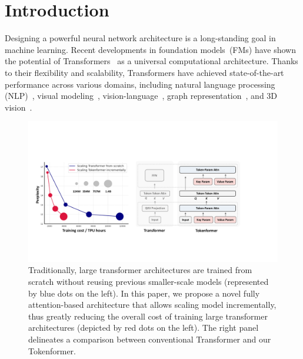 \documentclass{article} %
\begin{document}
\section{Introduction} \label{sec:intro}
Designing a powerful neural network architecture is a long-standing goal in machine learning. Recent developments in foundation models~(FMs) have shown the potential of Transformers~\citep{vaswani2017attention} as a universal computational architecture. Thanks to their flexibility and scalability, Transformers have achieved state-of-the-art performance across various domains, including natural language processing (NLP)~\citep{radford2018improving, radford2019language,brown2020language}, visual modeling~\citep{dosovitskiy2021an,liu2021swin}, vision-language~\citep{liu2023visual,wang2024git}, graph representation~\citep{ying2021graphormer}, and 3D vision~\citep{wang2023dsvt,wang2023unitr}.
\begin{figure}[h]
    \centering
    \includegraphics[width=0.99\linewidth]{./intro_v4.pdf}
    \vspace{-0.1cm}
    \caption{Traditionally, large transformer architectures are trained from scratch without reusing previous smaller-scale models (represented by blue dots on the left). In this paper, we propose a novel fully attention-based architecture that allows scaling model incrementally, thus greatly reducing the overall cost of training large transformer architectures (depicted by red dots on the left). The right panel delineates a comparison between conventional Transformer and our Tokenformer.}
    \label{fig:intro_figure}
    \vspace{-6pt}
\end{figure}
\end{document}
